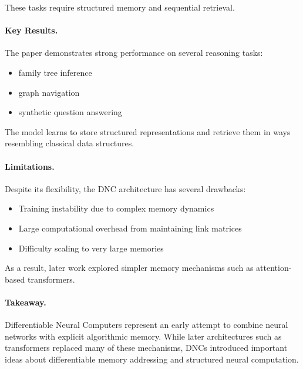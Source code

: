 \documentclass[12pt]{article}
\begin{document}
These tasks require structured memory and sequential retrieval.

\paragraph{Key Results.}

The paper demonstrates strong performance on several reasoning tasks:

\begin{itemize}
		\item family tree inference
		\item graph navigation
		\item synthetic question answering
\end{itemize}

The model learns to store structured representations and retrieve them
in ways resembling classical data structures.

\paragraph{Limitations.}

Despite its flexibility, the DNC architecture has several drawbacks:

\begin{itemize}
		\item Training instability due to complex memory dynamics
		\item Large computational overhead from maintaining link matrices
		\item Difficulty scaling to very large memories
\end{itemize}

As a result, later work explored simpler memory mechanisms such as attention-based
transformers.

\paragraph{Takeaway.}

Differentiable Neural Computers represent an early attempt to combine
neural networks with explicit algorithmic memory. While later architectures
such as transformers replaced many of these mechanisms, DNCs introduced
important ideas about differentiable memory addressing and structured
neural computation.
\end{document}
